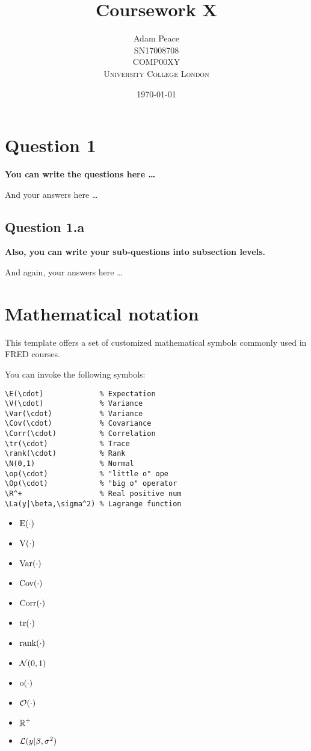\documentclass[12pt]{article}
\title{Coursework X} %
\author{Adam Peace\\
SN17008708\\
COMP00XY\\ %
\textsc{University College London}
}
\date{\today} %
\begin{document}
\setlength{\droptitle}{-5em}    
\maketitle

\section*{Question 1}
{\bfseries You can write the questions here \ldots}

And your answers here \ldots

\subsection*{Question 1.a}
{\bfseries Also, you can write your sub-questions into subsection levels.}

And again, your answers here \ldots

\section*{Mathematical notation}

This template offers a set of customized mathematical symbols commonly used in FRED courses.

\begin{multicols}{2}
You can invoke the following symbols:
\begin{Verbatim}[frame=single, fontsize=\footnotesize]
\E(\cdot)             % Expectation
\V(\cdot)             % Variance
\Var(\cdot)           % Variance
\Cov(\cdot)           % Covariance
\Corr(\cdot)          % Correlation
\tr(\cdot)            % Trace
\rank(\cdot)          % Rank
\N(0,1)               % Normal
\op(\cdot)            % "little o" ope
\Op(\cdot)            % "big o" operator
\R^+                  % Real positive num
\La(y|\beta,\sigma^2) % Lagrange function
\end{Verbatim}
\footnotesize{
\begin{itemize}  \setlength\itemsep{0em}
    \item $\operatorname{\mathrm{E}}(\cdot)$
    \item $\operatorname{\mathrm{V}}(\cdot)$
    \item $\operatorname{\mathrm{Var}}(\cdot)$
    \item $\operatorname*{Cov}(\cdot)$
    \item $\operatorname{\mathrm{Corr}}(\cdot)$
    \item $\operatorname{\mathrm{tr}}(\cdot)$
    \item $\operatorname{rank}(\cdot)$
    \item $\operatorname{\mathcal{N}}(0,1)$
    \item $\operatorname{\mathrm{o}}(\cdot)$
    \item $\operatorname{\mathcal{O}}(\cdot)$
    \item $\operatorname{\mathbb{R}}^{+}$
    \item $\operatorname{\mathcal{L}}(y|\beta,\sigma^2)$
\end{itemize}}
\end{multicols}
\end{document}
